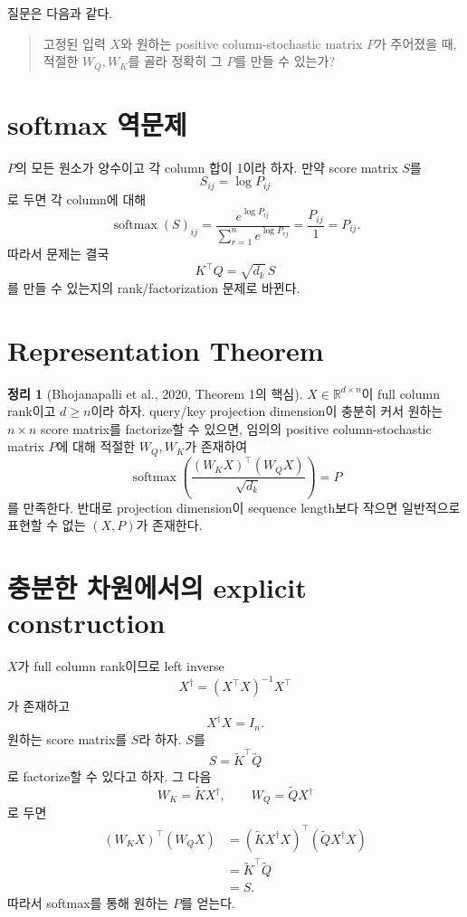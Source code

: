 \documentclass[11pt,a4paper,oneside,openany]{memoir}
\newcommand{\R}{\mathbb{R}}
\newcommand{\softmax}{\operatorname{softmax}}
\theoremstyle{definition}
\newtheorem{theorem}{정리}[chapter]
\begin{document}
질문은 다음과 같다.

\begin{quote}
고정된 입력 $X$와 원하는 positive column-stochastic matrix $P$가 주어졌을 때,
적절한 $W_Q,W_K$를 골라 정확히 그 $P$를 만들 수 있는가?
\end{quote}

\section{softmax 역문제}

$P$의 모든 원소가 양수이고 각 column 합이 1이라 하자.
만약 score matrix $S$를
\[
S_{ij}=\log P_{ij}
\]
로 두면 각 column에 대해
\[
\softmax(S)_{ij}
=
\frac{e^{\log P_{ij}}}{\sum_{r=1}^n e^{\log P_{rj}}}
=
\frac{P_{ij}}{1}
=P_{ij}.
\]
따라서 문제는 결국
\[
K^\top Q=\sqrt{d_k}\,S
\]
를 만들 수 있는지의 rank/factorization 문제로 바뀐다.

\section{Representation Theorem}

\begin{theorem}[Bhojanapalli et al., 2020, Theorem 1의 핵심]
$X\in\R^{d\times n}$이 full column rank이고 $d\ge n$이라 하자.
query/key projection dimension이 충분히 커서 원하는 $n\times n$ score matrix를 factorize할 수 있으면,
임의의 positive column-stochastic matrix $P$에 대해 적절한 $W_Q,W_K$가 존재하여
\[
\softmax\!\left(\frac{(W_KX)^\top(W_QX)}{\sqrt{d_k}}\right)=P
\]
를 만족한다. 반대로 projection dimension이 sequence length보다 작으면 일반적으로 표현할 수 없는 $(X,P)$가 존재한다.
\end{theorem}

\section{충분한 차원에서의 explicit construction}

$X$가 full column rank이므로 left inverse
\[
X^\dagger=(X^\top X)^{-1}X^\top
\]
가 존재하고
\[
X^\dagger X=I_n.
\]
원하는 score matrix를 $S$라 하자.
$S$를
\[
S=\widetilde K^\top\widetilde Q
\]
로 factorize할 수 있다고 하자. 그 다음
\[
W_K=\widetilde KX^\dagger,
\qquad
W_Q=\widetilde QX^\dagger
\]
로 두면
\begin{align*}
(W_KX)^\top(W_QX)
&=(\widetilde KX^\dagger X)^\top(\widetilde QX^\dagger X)\\
&=\widetilde K^\top\widetilde Q\\
&=S.
\end{align*}
따라서 softmax를 통해 원하는 $P$를 얻는다.
\end{document}
